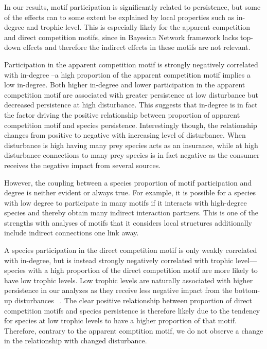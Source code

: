 \documentclass[12pt]{article}
\begin{document}
\begin{spacing}{2.0}
In our results, motif participation is significantly related to persistence, but some of the effects can to some extent be explained by local properties such as in-degree and trophic level. This is especially likely for the apparent competition and direct competition motifs, since in Bayesian Network framework lacks top-down effects and therefore the indirect effects in these motifs are not relevant. 


Participation in the apparent competition motif is strongly negatively correlated with in-degree --a high proportion of the apparent competition motif implies a low in-degree. Both higher in-degree and lower participation in the apparent competition motif are associated with greater persistence at low disturbance but decreased persistence at high disturbance. This suggests that in-degree is in fact the factor driving the positive relationship between proportion of apparent competition motif and species persistence. Interestingly though, the relationship changes from positive to negative with increasing level of disturbance. When disturbance is high having many prey species acts as an insurance, while at high disturbance connections to many prey species is in fact negative as the consumer receives the negative impact from several sources.   

However, the coupling between a species proportion of motif participation and degree is neither evident or always true. For example, it is possible for a species with low degree to participate in many motifs if it interacts with high-degree species and thereby obtain many indirect interaction partners. This is one of the strengths with analyses of motifs that it considers local structures additionally include indirect connections one link away.  


A species participation in the direct competition motif is only weakly correlated with in-degree, but is instead strongly negatively correlated with trophic level---species with a high proportion of the direct competition motif are more likely to have low trophic levels. Low trophic levels are naturally associated with higher persistence in our analyzes  as they receive less negative impact from the bottom-up disturbances ~\citep{Eklof2013}. The clear positive relationship between proportion of direct competition motifs and species persistence is therefore likely due to the tendency for species at low trophic levels to have a higher proportion of that motif. Therefore, contrary to the apparent comptition motif, we do not observe a change in the relationship with changed disturbance.


\end{spacing}
\end{document}
